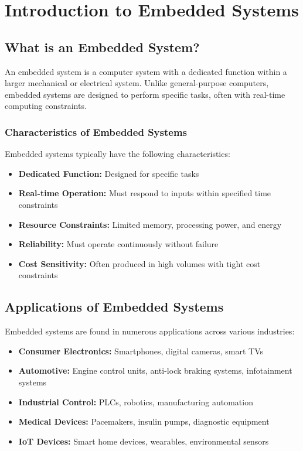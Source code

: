 \chapter{Introduction to Embedded Systems}

\section{What is an Embedded System?}

An embedded system is a computer system with a dedicated function within a larger mechanical or electrical system. Unlike general-purpose computers, embedded systems are designed to perform specific tasks, often with real-time computing constraints.

\subsection{Characteristics of Embedded Systems}

Embedded systems typically have the following characteristics:

\begin{itemize}
    \item \textbf{Dedicated Function:} Designed for specific tasks
    \item \textbf{Real-time Operation:} Must respond to inputs within specified time constraints
    \item \textbf{Resource Constraints:} Limited memory, processing power, and energy
    \item \textbf{Reliability:} Must operate continuously without failure
    \item \textbf{Cost Sensitivity:} Often produced in high volumes with tight cost constraints
\end{itemize}

\section{Applications of Embedded Systems}

Embedded systems are found in numerous applications across various industries:

\begin{itemize}
    \item \textbf{Consumer Electronics:} Smartphones, digital cameras, smart TVs
    \item \textbf{Automotive:} Engine control units, anti-lock braking systems, infotainment systems
    \item \textbf{Industrial Control:} PLCs, robotics, manufacturing automation
    \item \textbf{Medical Devices:} Pacemakers, insulin pumps, diagnostic equipment
    \item \textbf{IoT Devices:} Smart home devices, wearables, environmental sensors
\end{itemize}

